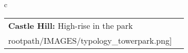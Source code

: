 \begin{table}[H]
        \begin{tabular}{c}
        \begin{tabular}{m{1.5in} m{2in}}
\textbf{Castle Hill:} {High-rise in the park} & \texttt{[image: \\rootpath/IMAGES/typology\_towerpark.png]}
\end{tabular}\end{tabular}
        \end{table}